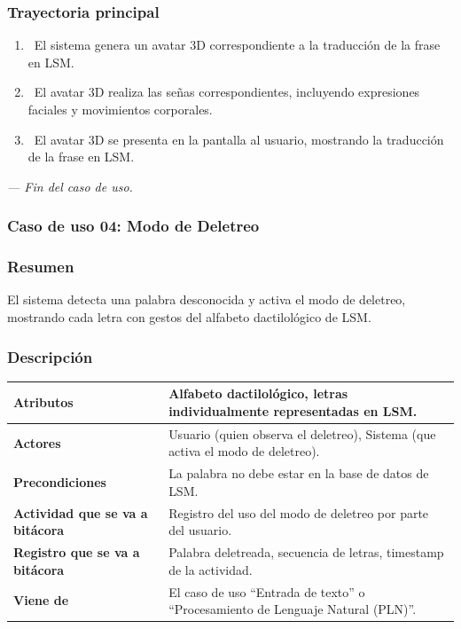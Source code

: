 \subsubsection{Trayectoria principal}
\begin{enumerate}[label=\textbf{\arabic*}, leftmargin=1.5cm]
    \item \UCsystem \ El sistema genera un avatar 3D correspondiente a la traducción de la frase en LSM.
    
    \item \UCsystem \ El avatar 3D realiza las señas correspondientes, incluyendo expresiones faciales y movimientos corporales.

    \item \UCsystem \ El avatar 3D se presenta en la pantalla al usuario, mostrando la traducción de la frase en LSM.

\end{enumerate}

\textit{--- Fin del caso de uso.}

\subsubsection{Caso de uso 04: Modo de Deletreo}
\subsubsection{Resumen}
El sistema detecta una palabra desconocida y activa el modo de deletreo, mostrando cada letra con gestos del alfabeto dactilológico de LSM.
\subsubsection{Descripción}
\noindent
\begin{tabularx}{\textwidth}{|l|X|}
\hline
\textbf{Atributos} & Alfabeto dactilológico, letras individualmente representadas en LSM. \\ \hline
\textbf{Actores} & Usuario (quien observa el deletreo), Sistema (que activa el modo de deletreo). \\ \hline
\textbf{Precondiciones} & La palabra no debe estar en la base de datos de LSM. \\ \hline
\textbf{Actividad que se va a bitácora} & Registro del uso del modo de deletreo por parte del usuario. \\ \hline
\textbf{Registro que se va a bitácora} & Palabra deletreada, secuencia de letras, timestamp de la actividad. \\ \hline
\textbf{Viene de} & El caso de uso “Entrada de texto” o “Procesamiento de Lenguaje Natural (PLN)”. \\ \hline
\end{tabularx}

